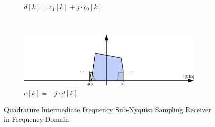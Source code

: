 \begin{figure}[p]
\begin{subfigure}{0.45\textwidth}
    \caption{$d[k] = c_1[k] + j \cdot c_0[k]$}
    \label{fig:rx_2_freq_d}
  \end{subfigure}
  \vspace{4ex} \\
  \begin{subfigure}{0.45\textwidth}
    \centering
    \includegraphics[width=\textwidth]{figures/rx_2_freq_e}
    \caption{$e[k] = -j \cdot d[k]$}
    \label{fig:rx_2_freq_e}
  \end{subfigure}
  \caption{Quadrature Intermediate Frequency Sub-Nyquist Sampling Receiver
    in Frequency Domain}
  \label{fig:rx_2_freq}
\end{figure}

